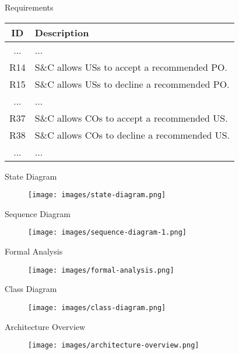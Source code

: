 \documentclass{beamer}
\begin{document}
\begin{frame}{Requirements}
\renewcommand{\arraystretch}{1.5}
\begin{longtable}{|c|p{8cm}|}
    \hline \rowcolor{polimiblue!40}
    \textbf{ID} & \textbf{Description} \\ \hline
    ... & ... \\ \hline
    R14 & S\&C allows USs to accept a recommended PO. \\ \hline
    R15 & S\&C allows USs to decline a recommended PO. \\ \hline
    ... & ... \\ \hline
    R37 & S\&C allows COs to accept a recommended US. \\ \hline
    R38 & S\&C allows COs to decline a recommended US. \\ \hline
    ... & ... \\ \hline
\end{longtable}
\end{frame}

\begin{frame}{State Diagram}
\begin{figure}
    \centering
    \texttt{[image: images/state-diagram.png]}
\end{figure}
\end{frame}

\begin{frame}{Sequence Diagram}
\begin{figure}
    \centering
    \texttt{[image: images/sequence-diagram-1.png]}
\end{figure}
\end{frame}

\begin{frame}{Formal Analysis}
\begin{figure}
    \centering
    \texttt{[image: images/formal-analysis.png]}
\end{figure}
\end{frame}

\begin{frame}{Class Diagram}
\begin{figure}
    \centering
    \texttt{[image: images/class-diagram.png]}
\end{figure}
\end{frame}

\begin{frame}{Architecture Overview}
\begin{figure}
    \centering
    \texttt{[image: images/architecture-overview.png]}
\end{figure}
\end{frame}
\end{document}
